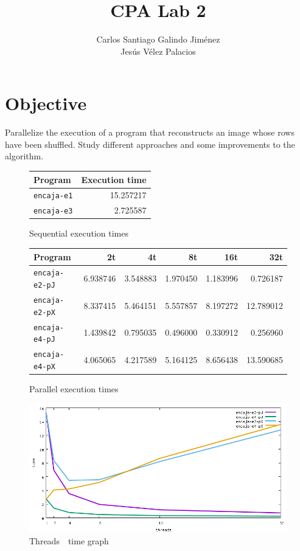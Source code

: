 \documentclass[a4paper]{article}
\title{CPA Lab 2}
\author{Carlos Santiago Galindo Jiménez\\Jesús Vélez Palacios}
\begin{document}
\maketitle
\section{Objective}
Parallelize the execution of a program that reconstructs an image whose rows have been shuffled. Study different approaches and some improvements to the algorithm.




\begin{figure}[h]
    \centering
    \begin{tabular}{l r}
        Program            & Execution time \\ \hline
        \texttt{encaja-e1} & 15.257217      \\
        \texttt{encaja-e3} &  2.725587      \\
    \end{tabular}
    \caption{Sequential execution times}
\end{figure}
\begin{figure}[h]
    \centering
    \begin{tabular}{l r r r r r}
        Program               & 2t        & 4t        & 8t        & 16t        & 32t        \\ \hline
        \texttt{encaja-e2-pJ} & 6.938746  & 3.548883  & 1.970450  & 1.183996   & 0.726187   \\
        \texttt{encaja-e2-pX} & 8.337415  & 5.464151  & 5.557857  & 8.197272   & 12.789012  \\
        \texttt{encaja-e4-pJ} & 1.439842  & 0.795035  & 0.496000  & 0.330912   & 0.256960   \\
        \texttt{encaja-e4-pX} & 4.065065  & 4.217589  & 5.164125  & 8.656438   & 13.590685  \\
    \end{tabular}
    \caption{Parallel execution times}
\end{figure}

\begin{figure}[h]
    \centering
    \includegraphics[width=\textwidth]{img/time}
    \caption{Threads\, \textemdash\unskip \, time graph}
\end{figure}
\end{document}
